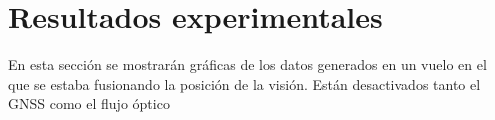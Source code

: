

\section{Resultados experimentales}
En esta sección se mostrarán gráficas de los datos generados en un vuelo en el que se estaba fusionando la posición de la visión. Están desactivados tanto el GNSS como el flujo óptico




\figExpA
\figExpB

\endinput
